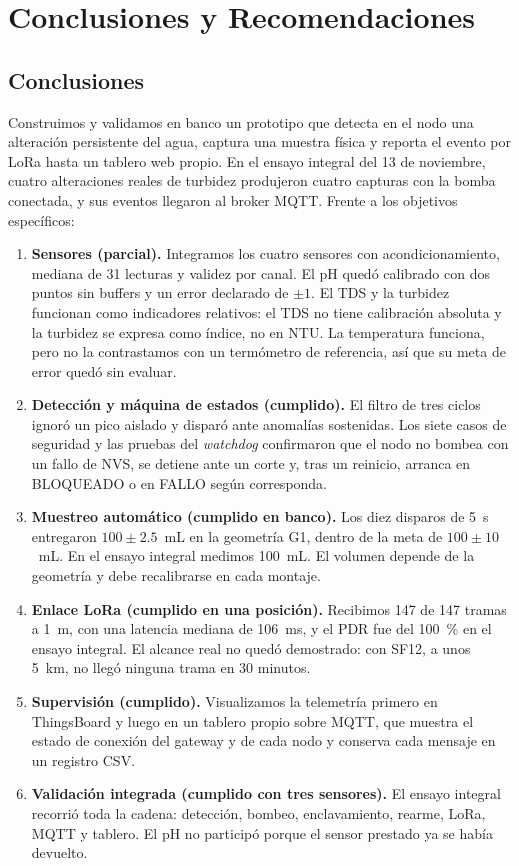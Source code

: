 \section{Conclusiones y Recomendaciones}
\label{sec:conclusiones}

\subsection{Conclusiones}

Construimos y validamos en banco un prototipo que detecta en el nodo una alteración persistente del agua, captura una muestra física y reporta el evento por LoRa hasta un tablero web propio. En el ensayo integral del 13 de noviembre, cuatro alteraciones reales de turbidez produjeron cuatro capturas con la bomba conectada, y sus eventos llegaron al broker MQTT. Frente a los objetivos específicos:

\begin{enumerate}
    \item \textbf{Sensores (parcial).} Integramos los cuatro sensores con acondicionamiento, mediana de 31 lecturas y validez por canal. El pH quedó calibrado con dos puntos sin buffers y un error declarado de $\pm 1$. El TDS y la turbidez funcionan como indicadores relativos: el TDS no tiene calibración absoluta y la turbidez se expresa como índice, no en NTU. La temperatura funciona, pero no la contrastamos con un termómetro de referencia, así que su meta de error quedó sin evaluar.
    \item \textbf{Detección y máquina de estados (cumplido).} El filtro de tres ciclos ignoró un pico aislado y disparó ante anomalías sostenidas. Los siete casos de seguridad y las pruebas del \textit{watchdog} confirmaron que el nodo no bombea con un fallo de NVS, se detiene ante un corte y, tras un reinicio, arranca en BLOQUEADO o en FALLO según corresponda.
    \item \textbf{Muestreo automático (cumplido en banco).} Los diez disparos de 5~s entregaron $100 \pm 2.5$~mL en la geometría G1, dentro de la meta de $100 \pm 10$~mL. En el ensayo integral medimos 100~mL. El volumen depende de la geometría y debe recalibrarse en cada montaje.
    \item \textbf{Enlace LoRa (cumplido en una posición).} Recibimos 147 de 147 tramas a 1~m, con una latencia mediana de 106~ms, y el PDR fue del 100~\% en el ensayo integral. El alcance real no quedó demostrado: con SF12, a unos 5~km, no llegó ninguna trama en 30 minutos.
    \item \textbf{Supervisión (cumplido).} Visualizamos la telemetría primero en ThingsBoard y luego en un tablero propio sobre MQTT, que muestra el estado de conexión del gateway y de cada nodo y conserva cada mensaje en un registro CSV.
    \item \textbf{Validación integrada (cumplido con tres sensores).} El ensayo integral recorrió toda la cadena: detección, bombeo, enclavamiento, rearme, LoRa, MQTT y tablero. El pH no participó porque el sensor prestado ya se había devuelto.
\end{enumerate}

